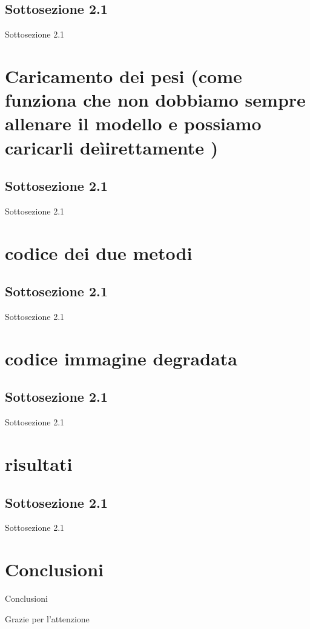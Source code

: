 \documentclass[11pt]{beamer}
\begin{document}
\subsection{Sottosezione 2.1}
\begin{frame}{Sottosezione 2.1}
\end{frame}

\section{Caricamento dei pesi (come funziona che non dobbiamo sempre allenare il modello e possiamo caricarli deìirettamente )} 
\subsection{Sottosezione 2.1}
\begin{frame}{Sottosezione 2.1}
\end{frame}

\section{codice dei due metodi} 
\subsection{Sottosezione 2.1}
\begin{frame}{Sottosezione 2.1}
\end{frame}

\section{codice immagine degradata} 
\subsection{Sottosezione 2.1}
\begin{frame}{Sottosezione 2.1}
\end{frame}

\section{risultati} 
\subsection{Sottosezione 2.1}
\begin{frame}{Sottosezione 2.1}
\end{frame}

\section{Conclusioni}
\begin{frame}{Conclusioni}
\end{frame}

\begin{frame}
  \centering
  {\Huge Grazie per l'attenzione}
\end{frame}
\end{document}
